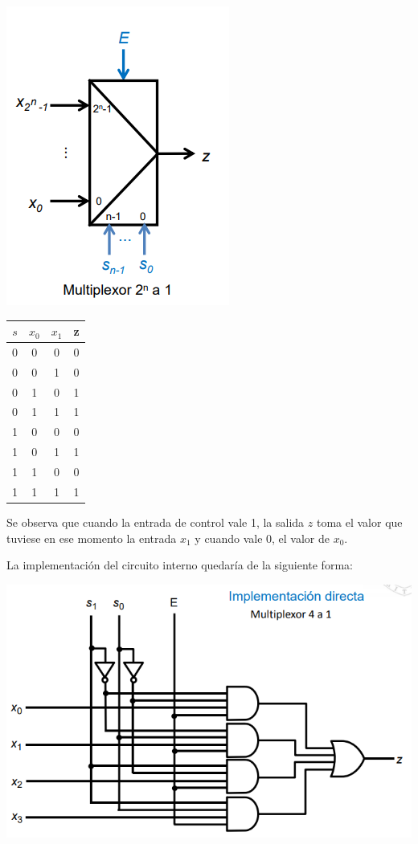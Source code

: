 \documentclass[a4paper,10pt]{book}
\begin{document}
\begin{multicols}{2}

\begin{center}
\includegraphics[scale=0.80]{multiplexor}
\end{center}

\begin{center}
\begin{tabular}{|c|c|c|c|}
\hline
$s$ & $x_0$ & $x_1$ & z \\
\hline
0 & 0 & 0 & 0 \\
\hline
0 & 0 & 1 & 0 \\
\hline
0 & 1 & 0 & 1 \\
\hline
0 & 1 & 1 & 1 \\
\hline
1 & 0 & 0 & 0 \\
\hline
1 & 0 & 1 & 1 \\
\hline
1 & 1 & 0 & 0 \\
\hline
1 & 1 & 1 & 1 \\
\hline
\end{tabular}
\end{center}
\end{multicols}
Se observa que cuando la entrada de control vale 1, la salida  $z$ toma el valor que tuviese en ese momento la entrada $x_1$ y cuando vale 0, el valor de $x_0$.\par
La implementación del circuito interno quedaría de la siguiente forma:
\begin{center}
\includegraphics[scale=0.75]{implementacion multiplexor}
\end{center}
\end{document}

